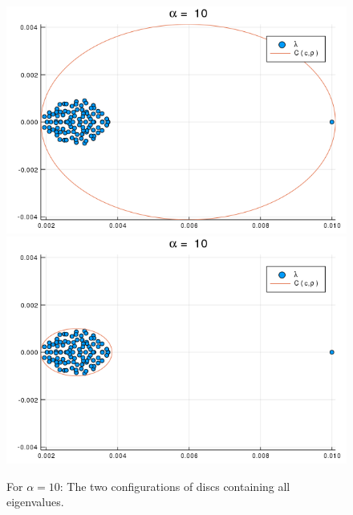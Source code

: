 \begin{figure}[h!]
\centering
\includegraphics[scale=0.4]{../task2/images/Task2_b_a10_1.png}
\includegraphics[scale=0.4]{../task2/images/Task2_b_a10_2.png}
\caption{For $\alpha = 10$: The two configurations of discs containing all eigenvalues.}
\label{fig:task2b_10}
\end{figure}


